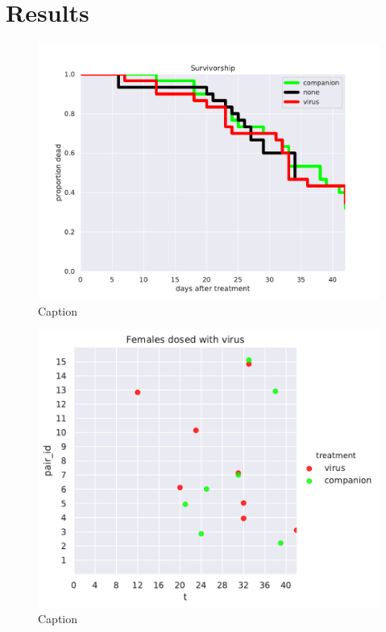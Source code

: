 \documentclass[11pt,letterpaper]{scrartcl}
\begin{document}
\section{Results}

\begin{figure}[h]
\centering
\includegraphics[width=\textwidth]{survivorship.pdf}
\caption{Caption}
\label{fig:survivorship}
\end{figure}

\begin{figure}[h]
\centering
\includegraphics[width=\textwidth]{tf.pdf}
\caption{Caption}
\label{fig:tf}
\end{figure}
\end{document}
